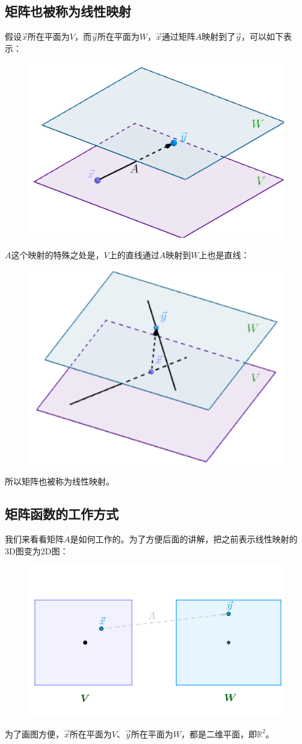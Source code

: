 \documentclass[12pt]{article}
\begin{document}
\subsection{矩阵也被称为线性映射}
假设$\vec{x}$所在平面为$V$，而$\vec{y}$所在平面为$W$，$\vec{x}$通过矩阵$A$映射到了$\vec{y}$，可以如下表示：
\begin{figure}[H]
\centering
\includegraphics[width=.3\textwidth]{fig/UnderstandMatrixMultiplication_1.png} 
\end{figure}

$A$这个映射的特殊之处是，$V$上的直线通过$A$映射到$W$上也是直线：
\begin{figure}[H]
\centering
\includegraphics[width=.3\textwidth]{fig/UnderstandMatrixMultiplication_2.png}
\end{figure}

所以矩阵也被称为线性映射。

\subsection{矩阵函数的工作方式}
我们来看看矩阵$A$是如何工作的。为了方便后面的讲解，把之前表示线性映射的3D图变为2D图：
\begin{figure}[H]
\centering
\includegraphics[width=.5\textwidth]{fig/UnderstandMatrixMultiplication_3.png}
\end{figure}

为了画图方便，$\vec{x}$所在平面为$V$、$\vec{y}$所在平面为$W$，都是二维平面，即$\mathbb{R}^2$。
\end{document}
